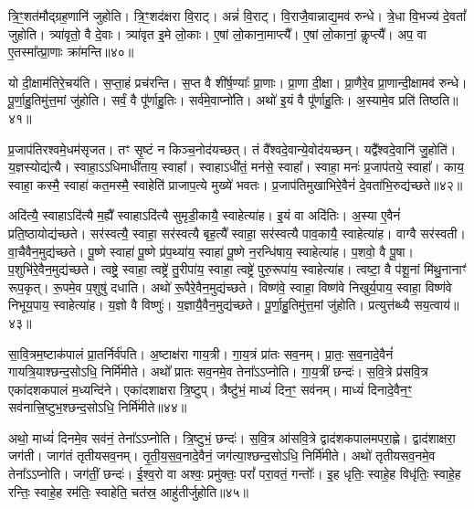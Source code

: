त्रि॒ꣳ॒शत॑मौद्ग्रह॒णानि॑ जुहोति।
त्रि॒ꣳ॒शद॑क्षरा वि॒राट्।
अन्नं॑ वि॒राट्।
वि॒राजै॒वान्नाद्य॒मव॑ रुन्धे।
त्रे॒धा वि॒भज्य॑ दे॒वतां᳚ जुहोति।
त्र्या॑वृतो॒ वै दे॒वाः।
त्र्या॑वृत इ॒मे लो॒काः।
ए॒षां लो॒काना॒माप्त्यै᳚।
ए॒षां लो॒कानां॒ कॢप्त्यै᳚।
अप॒ वा ए॒तस्मा᳚त्प्रा॒णाः क्रा॑मन्ति॥४०॥\ip

यो दी॒क्षाम॑तिरे॒चय॑ति।
स॒प्ता॒हं प्रच॑रन्ति।
स॒प्त वै शी॑र्\mbox{}ष॒ण्याः᳚ प्रा॒णाः।
प्रा॒णा दी॒क्षा।
प्रा॒णैरे॒व प्रा॒णान्दी॒क्षामव॑ रुन्धे।
पू॒र्णा॒हु॒तिमु॑त्त॒मां जु॑होति।
सर्वं॒ वै पू᳚र्णाहु॒तिः।
सर्व॑\-मे॒वा\-प्नो॑ति।
अथो॑ इ॒यं वै पू᳚र्णाहु॒तिः।
अ॒स्यामे॒व प्रति॑ तिष्ठति॥४१॥\ip\anuvakamend[रु॒न्धे॒ प्रा॒णान्दी॒क्षामव॑ रुन्ध उच्यते क्रामन्ति तिष्ठति]

प्र॒जा\-प॑तिरश्वमे॒धम॑\-सृजत।
तꣳ सृ॒ष्टं न किञ्च॒नोद॑यच्छत्।
तं वै᳚श्वदे॒वान्ये॒वोद॑यच्छन्।
यद्वै᳚श्वदे॒वानि॑ जु॒होति॑।
य॒ज्ञस्योद्य॑त्यै।
स्वाहा॒\-ऽऽधिमाधी॑ताय॒ स्वाहा᳚।
स्वाहा\-ऽधी॑तं॒ मन॑से॒ स्वाहा᳚।
स्वाहा॒ मनः॑ प्र॒जा\-प॑तये॒ स्वाहा᳚।
काय॒ स्वाहा॒ कस्मै॒ स्वाहा॑ कत॒मस्मै॒ स्वाहेति॑ प्राजाप॒त्ये मुख्ये॑ भवतः।
प्र॒जा\-प॑तिमुखाभिरे॒वैनं॑ दे॒वता॑भि॒रुद्य॑च्छते॥४२॥\ip

अदि॑त्यै॒ स्वाहा\-ऽदि॑त्यै म॒ह्यै᳚ स्वाहा\-ऽदि॑त्यै सुमृडी॒कायै॒ स्वाहेत्या॑ह।
इ॒यं वा अदि॑तिः।
अ॒स्या ए॒वैनं॑ प्रति॒ष्ठायोद्य॑च्छते।
सर॑स्वत्यै॒ स्वाहा॒ सर॑स्वत्यै बृह॒त्यै᳚ स्वाहा॒ सर॑स्वत्यै पाव॒कायै॒ स्वाहेत्या॑ह।
वाग्वै सर॑स्वती।
वा॒चैवैन॒मुद्य॑च्छते।
पू॒ष्णे स्वाहा॑ पू॒ष्णे प्र॑प॒थ्या॑य॒ स्वाहा॑ पू॒ष्णे न॒रन्धि॑षाय॒ स्वाहेत्या॑ह।
प॒शवो॒ वै पू॒षा।
प॒शुभि॑रे॒वैन॒मुद्य॑च्छते।
त्वष्ट्रे॒ स्वाहा॒ त्वष्ट्रे॑ तु॒रीपा॑य॒ स्वाहा॒ त्वष्ट्रे॑ पुरु॒रूपा॑य॒ स्वाहेत्या॑ह।
त्वष्टा॒ वै प॑शू॒नां मि॑थु॒नानाꣳ॑ रूप॒कृत्।
रू॒पमे॒व प॒शुषु॑ दधाति।
अथो॑ रू॒पैरे॒वैन॒मुद्य॑च्छते।
विष्ण॑वे॒ स्वाहा॒ विष्ण॑वे निखुर्य॒पाय॒ स्वाहा॒ विष्ण॑वे निभूय॒पाय॒ स्वाहेत्या॑ह।
य॒ज्ञो वै विष्णुः॑।
य॒ज्ञायै॒वैन॒मुद्य॑च्छते।
पू॒र्णा॒हु॒तिमु॑त्त॒मां जु॑होति।
प्रत्युत्त॑ब्ध्यै सय॒त्वाय॑॥४३॥\ip\anuvakamend[य॒च्छ॒ते॒ पु॒रु॒रूपा॑य॒ स्वाहेत्या॑हा॒ष्टौ च॑]

सा॒वि॒त्रम॒ष्टा\-क॑पालं प्रा॒तर्निर्व॑पति।
अ॒ष्टाक्ष॑रा गाय॒त्री।
गा॒य॒त्रं प्रा॑तः सव॒नम्।
प्रा॒तः॒ स॒व॒नादे॒वैनं॑ गायत्रि॒याश्छन्द॒सो\-ऽधि॒ निर्मि॑मीते।
अथो᳚ प्रातः सव॒नमे॒व तेना᳚ऽऽप्नोति।
गा॒य॒त्रीं छन्दः॑।
स॒वि॒त्रे प्र॑सवि॒त्र एका॑\-दश\-कपालं म॒ध्यन्दि॑ने।
एका॑दशाक्षरा त्रि॒ष्टुप्।
त्रैष्टु॑भं॒ माध्यं॑ दिन॒ꣳ॒ सव॑नम्।
माध्यं॑ दिनादे॒वैन॒ꣳ॒ सव॑नात्त्रि॒ष्टुभ॒श्छन्द॒सोऽधि॒ निर्मि॑मीते॥४४॥\ip

अथो॒ माध्यं॑ दिनमे॒व सव॑नं॒ तेना᳚ऽऽप्नोति।
त्रि॒ष्टुभं॒ छन्दः॑।
स॒वि॒त्र आ॑सवि॒त्रे द्वाद॑शकपालमपरा॒ह्णे।
द्वाद॑शाक्षरा॒ जग॑ती।
जाग॑तं तृतीयसव॒नम्।
तृ॒ती॒य॒स॒व॒नादे॒वैनं॒ जग॑त्या॒श्छन्द॒सोऽधि॒ निर्मि॑मीते।
अथो॑ तृतीयसव॒नमे॒व तेना᳚ऽऽप्नोति।
जग॑तीं॒ छन्दः॑।
ई॒श्व॒रो वा अश्वः॒ प्रमु॑क्तः॒ परां᳚ परा॒वतं॒ गन्तोः᳚।
इ॒ह धृतिः॒ स्वाहे॒ह विधृ॑तिः॒ स्वाहे॒ह रन्तिः॒ स्वाहे॒ह रम॑तिः॒ स्वाहेति॒ चत॑स्र॒ आहु॑तीर्जुहोति॥४५॥\ip

